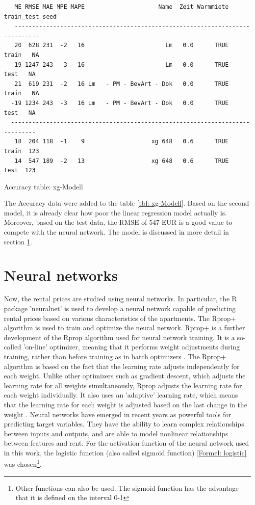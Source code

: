 \begin{table}[H]
	\begin{verbatim}
   ME RMSE MAE MPE MAPE                     Name  Zeit Warmmiete train_test seed
   -----------------------------------------------------------------------------
   20  628 231  -2   16                       Lm   0.0      TRUE      train   NA
  -19 1247 243  -3   16                       Lm   0.0      TRUE       test   NA
   21  619 231  -2   16 Lm   - PM - BevArt - Dok   0.0      TRUE      train   NA
  -19 1234 243  -3   16 Lm   - PM - BevArt - Dok   0.0      TRUE       test   NA
  -----------------------------------------------------------------------------
   18  204 118  -1    9                   xg 648   0.6      TRUE      train  123
   14  547 189  -2   13                   xg 648   0.6      TRUE       test  123	
	\end{verbatim}
	\caption{Accuracy table: xg-Modell}
	\label{tbl: xg-Modell}
\end{table}

The Accuracy data were added to the table  \ref{tbl: xg-Modell}. Based on the second model, it is already clear how poor the linear regression model actually is. Moreover, based on the test data, the RMSE of 547 EUR is a good value to compete with the neural network. The model is discussed in more detail in section \ref{sec:NN}.

\section{Neural networks}\label{sec:NN}

Now, the rental prices are studied using neural networks. In particular, the R package 'neuralnet' is used to develop a neural network capable of predicting rental prices based on various characteristics of the apartments. The Rprop+ algorithm is used to train and optimize the neural network. Rprop+ is a further development of the Rprop algorithm used for neural network training. It is a so-called 'on-line' optimizer, meaning that it performs weight adjustments during training, rather than before training as in batch optimizers \cite{Riedmill NN 1993}. The Rprop+ algorithm is based on the fact that the learning rate adjusts independently for each weight. Unlike other optimizers such as gradient descent, which adjusts the learning rate for all weights simultaneously, Rprop adjusts the learning rate for each weight individually. It also uses an 'adaptive' learning rate, which means that the learning rate for each weight is adjusted based on the last change in the weight \cite{Ruder NN rprop+}.
Neural networks have emerged in recent years as powerful tools for predicting target variables. They have the ability to learn complex relationships between inputs and outputs, and are able to model nonlinear relationships between features and rent. For the activation function of the neural network used in this work, the logistic function (also called sigmoid function) \ref{Formel: logistic}  was chosen\footnote{Other functions can also be used. The sigmoid function has the advantage that it is defined on the interval 0-1}.


